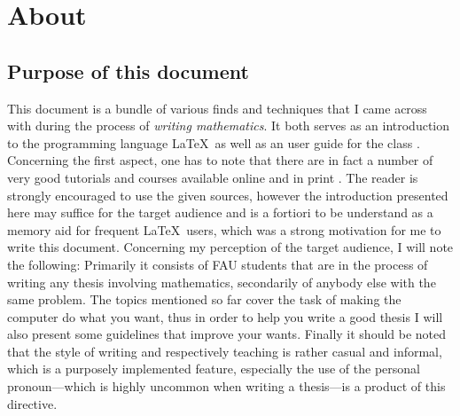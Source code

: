 \chapter{About}\label{ch:One}
\section{Purpose of this document}
This document is a bundle of various finds and techniques that I came across with 
during the process of \textit{writing mathematics}. It both serves as an introduction 
to the programming language \LaTeX\ as well as an user guide for the class 
\texttt{\classname}. Concerning the first aspect, one has to note that there are in fact 
a number of very good tutorials and courses available online and in print \cite{latex}.
The reader is strongly encouraged to use the given sources, however the introduction 
presented here may suffice for the target audience and is a fortiori to be understand as a 
memory aid for frequent \LaTeX\ users, which was a strong motivation for me to write 
this document. Concerning my perception of the target audience, I will note the following: 
Primarily it consists of FAU students that are in the process of writing any thesis 
involving mathematics, secondarily of anybody else with the same problem. 
The topics mentioned so far cover the task of making the computer do what you want, thus 
in order to help you write a good thesis I will also present some guidelines that improve 
your wants. Finally it should be noted that the style of writing and respectively teaching 
is rather casual and informal, which is a purposely implemented feature, especially the use 
of the personal pronoun---which is highly uncommon when writing a thesis---is a product of this 
directive.
